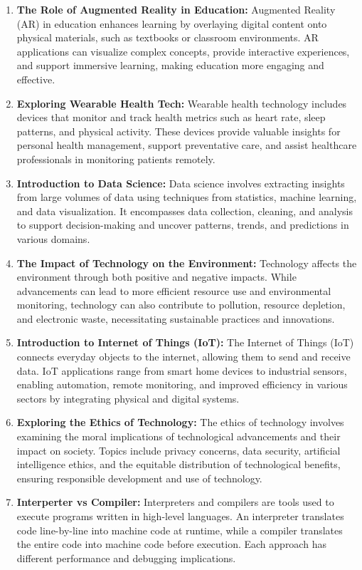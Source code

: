 \begin{enumerate}
    \item \textbf{The Role of Augmented Reality in Education:} Augmented Reality (AR) in education enhances learning by overlaying digital content onto physical materials, such as textbooks or classroom environments. AR applications can visualize complex concepts, provide interactive experiences, and support immersive learning, making education more engaging and effective.
    \item \textbf{Exploring Wearable Health Tech:} Wearable health technology includes devices that monitor and track health metrics such as heart rate, sleep patterns, and physical activity. These devices provide valuable insights for personal health management, support preventative care, and assist healthcare professionals in monitoring patients remotely.
    \item \textbf{Introduction to Data Science:} Data science involves extracting insights from large volumes of data using techniques from statistics, machine learning, and data visualization. It encompasses data collection, cleaning, and analysis to support decision-making and uncover patterns, trends, and predictions in various domains.
    \item \textbf{The Impact of Technology on the Environment:} Technology affects the environment through both positive and negative impacts. While advancements can lead to more efficient resource use and environmental monitoring, technology can also contribute to pollution, resource depletion, and electronic waste, necessitating sustainable practices and innovations.
    \item \textbf{Introduction to Internet of Things (IoT):} The Internet of Things (IoT) connects everyday objects to the internet, allowing them to send and receive data. IoT applications range from smart home devices to industrial sensors, enabling automation, remote monitoring, and improved efficiency in various sectors by integrating physical and digital systems.
    \item \textbf{Exploring the Ethics of Technology:} The ethics of technology involves examining the moral implications of technological advancements and their impact on society. Topics include privacy concerns, data security, artificial intelligence ethics, and the equitable distribution of technological benefits, ensuring responsible development and use of technology.
    \item \textbf{Interperter vs Compiler:} Interpreters and compilers are tools used to execute programs written in high-level languages. An interpreter translates code line-by-line into machine code at runtime, while a compiler translates the entire code into machine code before execution. Each approach has different performance and debugging implications.

\end{enumerate}
